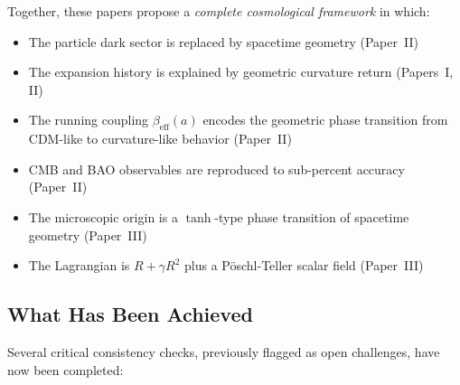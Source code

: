 \documentclass[aps,prd,twocolumn,superscriptaddress,nofootinbib]{revtex4-2}
\begin{document}
Together, these papers propose a \textit{complete cosmological framework} in which:
\begin{itemize}
\item The particle dark sector is replaced by spacetime geometry (Paper~II)
\item The expansion history is explained by geometric curvature return (Papers~I, II)
\item The running coupling $\beta_{\mathrm{eff}}(a)$ encodes the geometric phase transition from CDM-like to curvature-like behavior (Paper~II)
\item CMB and BAO observables are reproduced to sub-percent accuracy (Paper~II)
\item The microscopic origin is a $\tanh$-type phase transition of spacetime geometry (Paper~III)
\item The Lagrangian is $R + \gamma R^2$ plus a P\"oschl-Teller scalar field (Paper~III)
\end{itemize}

\subsection{What Has Been Achieved}

Several critical consistency checks, previously flagged as open challenges, have now been completed:
\end{document}
